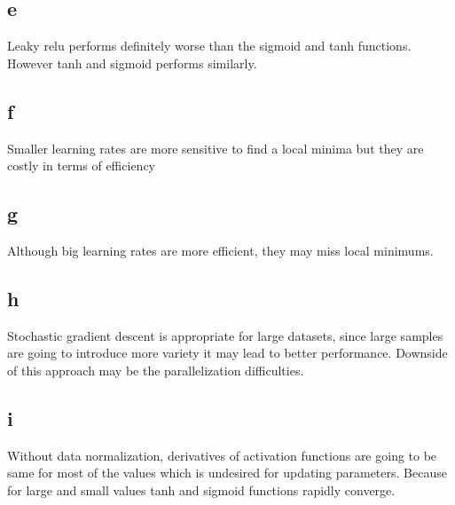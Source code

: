 \documentclass[12pt,a4paper, margin=1in]{article}
\begin{document}
\subsection*{e}
Leaky relu performs definitely worse than the sigmoid and tanh functions. However tanh and sigmoid performs similarly.

\subsection*{f}
Smaller learning rates are more sensitive to find a local minima but they are costly in terms of efficiency

\subsection*{g}
Although big learning rates are more efficient, they may miss local minimums. 

\subsection*{h}
Stochastic gradient descent is appropriate for large datasets, since large samples are going to introduce more variety it may lead to better performance.
Downside of this approach may be the parallelization difficulties.

\subsection*{i}
Without data normalization, derivatives of activation functions are going to be same for most of the values which is undesired for updating parameters. Because for large and small values tanh and sigmoid functions rapidly converge. 
\end{document}
